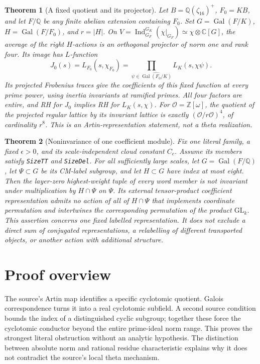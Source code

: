 \documentclass[11pt]{article}
\newtheorem{theorem}{Theorem}[section]
\theoremstyle{remark}\newtheorem{remark}[theorem]{Remark}
\newcommand{\Q}{\mathbb Q}
\newcommand{\Z}{\mathbb Z}
\newcommand{\Gal}{\operatorname{Gal}}
\begin{document}
\begin{theorem}[A fixed quotient and its projector]\label{thm:projector}
Let $B=\Q(\zeta_{16})^+$, $F_0=KB$, and let $F/\Q$ be any
finite abelian extension containing $F_0$. Set $G=\Gal(F/K)$,
$H=\Gal(F/F_0)$, and $r=|H|$. On
$V=\operatorname{Ind}_{G_F}^{G_K}(\chi|_{G_F})
\simeq\chi\otimes\mathbb C[G]$, the average of the right $H$-actions
is an orthogonal projector of norm one and rank four. Its image has
$L$-function
\[
 J_0(s)=L_{F_0}(s,\chi_{F_0})
       =\prod_{\psi\in\widehat{\Gal(F_0/K)}}L_K(s,\chi\psi).
\]
Its projected Frobenius traces give the coefficients of this fixed
function at every prime power, using inertia invariants at ramified
primes. All four factors are entire, and RH for $J_0$ implies RH
for $L_K(s,\chi)$. For $\mathcal O=\Z[\omega]$, the quotient of
the projected regular lattice by its invariant lattice is exactly
$(\mathcal O/r\mathcal O)^4$, of cardinality $r^8$.
This is an Artin-representation statement, not a theta realization.
\end{theorem}

\begin{theorem}[Noninvariance of one coefficient module]
\label{thm:highest}
Fix one literal family, a fixed $\epsilon>0$, and its
scale-independent cloud constant $C_c$. Assume its members satisfy
\texttt{SizeTT} and \texttt{SizeDel}.
For all sufficiently large scales, let $G=\Gal(F/\Q)$, let
$\Psi\subset G$ be its CM-label subgroup, and let $H\subset G$
have index at most eight. Then the layer-zero highest-weight tuple
of every word member is not invariant under multiplication by
$H\cap\Psi$ on $\Psi$. Its external tensor-product coefficient
representation admits no action of all of $H\cap\Psi$ that
implements coordinate permutation and intertwines the corresponding
permutation of the product $\mathrm{GL}_k$.
This assertion concerns one fixed labelled representation. It does
not exclude a direct sum of conjugated representations, a relabelling
of different transported objects, or another action with additional
structure.
\end{theorem}

\section*{Proof overview}
The source's Artin map identifies a specific cyclotomic quotient.
Galois correspondence turns it into a real cyclotomic subfield.
A second source condition bounds the index of a distinguished cyclic
subgroup; together these force the cyclotomic conductor beyond the
entire prime-ideal norm range. This proves the strongest literal
obstruction without an analytic hypothesis. The distinction between
absolute norm and rational residue characteristic explains why it
does not contradict the source's local theta mechanism.
\end{document}
